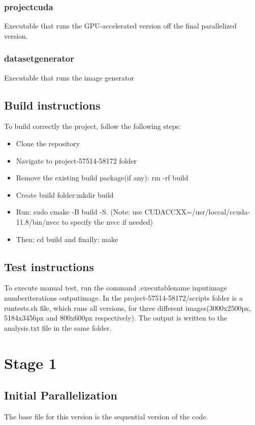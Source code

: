 \documentclass[sigconf]{acmart}
\begin{document}
\subsubsection{project\textunderscore cuda}
Executable that runs the GPU-accelerated version off the final parallelized version.

\subsubsection{dataset\textunderscore generator}
Executable that runs the image generator

\subsection{Build instructions}
To build correctly the project, follow the following steps:
\begin{itemize}
    \item Clone the repository
    \item Navigate to project-57514-58172 folder
    \item Remove the existing build package(if any): rm -rf build
    \item Create build folder:mkdir build
    \item Run: sudo cmake -B build -S. (Note: use CUDACCXX=/usr/loccal/ccuda-11.8/bin/nvcc to specify the nvcc if needed)
    \item Then: cd build and finally: make
\end{itemize}

\subsection{Test instructions}
To execute manual test, run the command .\/{executable\textunderscore name} input\textunderscore image number\textunderscore iterations output\textunderscore image. 
In the project-57514-58172/scripts folder is a run\textunderscore tests.sh file, which runs all versions, for three different images(3000x2500px, 5184x3456px and 800x600px respectively). The output is written to the analysis.txt file in the same folder.
\section{Stage 1}
\subsection{Initial Parallelization}
The base file for this version is the sequential version of the code.
\end{document}
